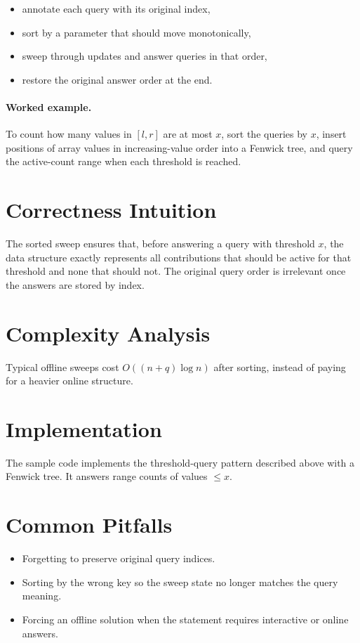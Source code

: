 \begin{itemize}
  \item annotate each query with its original index,
  \item sort by a parameter that should move monotonically,
  \item sweep through updates and answer queries in that order,
  \item restore the original answer order at the end.
\end{itemize}

\paragraph{Worked example.}
To count how many values in \([l, r]\) are at most \(x\), sort the queries by \(x\), insert positions of array values
in increasing-value order into a Fenwick tree, and query the active-count range when each threshold is reached.

\section*{Correctness Intuition}

The sorted sweep ensures that, before answering a query with threshold \(x\), the data structure exactly represents all
contributions that should be active for that threshold and none that should not. The original query order is irrelevant
once the answers are stored by index.

\section*{Complexity Analysis}

Typical offline sweeps cost \(O((n + q)\log n)\) after sorting, instead of paying for a heavier online structure.

\section*{Implementation}

The sample code implements the threshold-query pattern described above with a Fenwick tree. It answers range counts of
values \(\le x\).

\section*{Common Pitfalls}

\begin{itemize}
  \item Forgetting to preserve original query indices.
  \item Sorting by the wrong key so the sweep state no longer matches the query meaning.
  \item Forcing an offline solution when the statement requires interactive or online answers.
\end{itemize}

